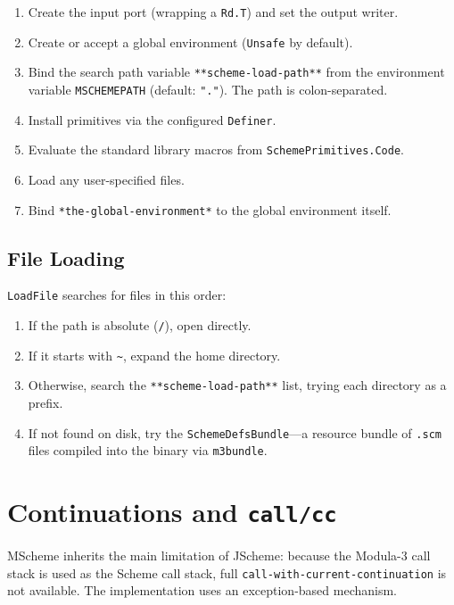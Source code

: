 \documentclass[12pt]{report}
\begin{document}
\begin{enumerate}
\item Create the input port (wrapping a \texttt{Rd.T}) and set the
  output writer.
\item Create or accept a global environment (\texttt{Unsafe} by default).
\item Bind the search path variable \texttt{**scheme-load-path**} from the
  environment variable \texttt{MSCHEMEPATH} (default: \texttt{"."}).
  The path is colon-separated.
\item Install primitives via the configured \texttt{Definer}.
\item Evaluate the standard library macros from \texttt{SchemePrimitives.Code}.
\item Load any user-specified files.
\item Bind \texttt{*the-global-environment*} to the global environment
  itself.
\end{enumerate}

\section{File Loading}

\texttt{LoadFile} searches for files in this order:

\begin{enumerate}
\item If the path is absolute (\texttt{/}), open directly.
\item If it starts with \texttt{\~{}}, expand the home directory.
\item Otherwise, search the \texttt{**scheme-load-path**} list, trying
  each directory as a prefix.
\item If not found on disk, try the \texttt{SchemeDefsBundle}---a
  resource bundle of \texttt{.scm} files compiled into the binary
  via \texttt{m3bundle}.
\end{enumerate}

\chapter{Continuations and \texttt{call/cc}}
\label{sec:callcc}

MScheme inherits the main limitation of JScheme: because the Modula-3
call stack is used as the Scheme call stack, full
\texttt{call-with-current-continuation} is not available.
The implementation uses an exception-based mechanism.
\end{document}
